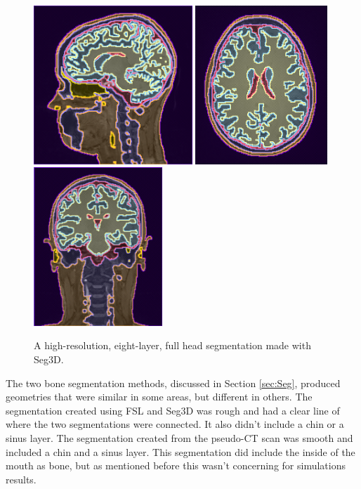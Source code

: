 \begin{figure}[H]
\begin{center}
\includegraphics[height=2.35in]{Figures/seg_1}
\includegraphics[height=2.35in]{Figures/seg_2}
\includegraphics[height=2.35in]{Figures/seg_3}
\caption{A high-resolution, eight-layer, full head segmentation made with Seg3D.}
\label{fig:fullseg}
\end{center}
\end{figure}

The two bone segmentation methods, discussed in Section \ref{sec:Seg}, produced geometries that were similar in some areas, but different in others. The segmentation created using FSL and Seg3D was rough and had a clear line of where the two segmentations were connected. It also didn't include a chin or a sinus layer. The segmentation created from the pseudo-CT scan was smooth and included a chin and a sinus layer. This segmentation did include the inside of the mouth as bone, but as mentioned before this wasn't concerning for simulations results.

